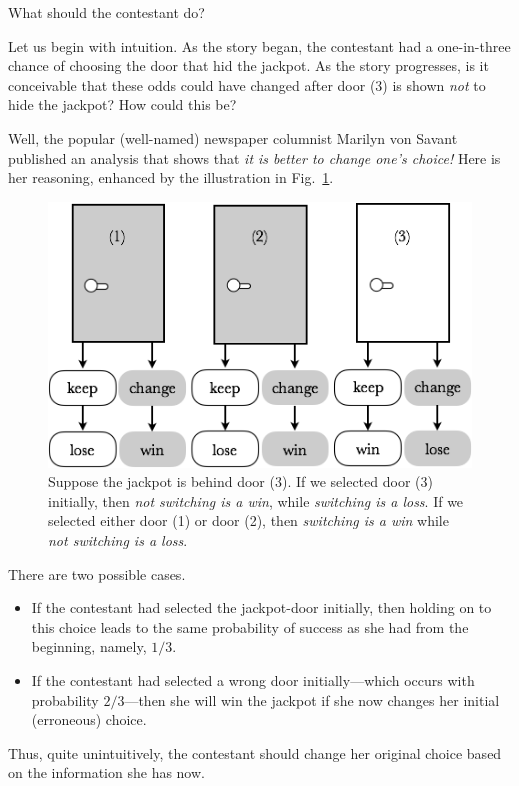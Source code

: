 \medskip

What should the contestant do?  

\medskip

Let us begin with intuition.  As the story began, the contestant had a one-in-three chance of choosing the door that hid the jackpot.  As the story progresses, is it conceivable that these odds could have changed after door (3) is shown {\em not} to hide the jackpot?  How could this be?

\smallskip

Well, the popular (well-named) newspaper columnist Marilyn von Savant published an analysis that shows that {\em it is better to change one's choice!}  Here is her reasoning, enhanced by the illustration in Fig.~\ref{fig:MonthyHall-2}.
\begin{figure}[htb]
\begin{center}
        \includegraphics[scale=0.4]{FiguresMaths/MonthyHall}
        \caption{Suppose the jackpot is behind door (3).  If we selected door (3) initially, then {\em not switching is a win}, while {\em switching is a loss}.  If we selected either door (1) or door (2), then {\em switching is a win}  while {\em not switching is a loss}.}
        \label{fig:MonthyHall-2}
\end{center}
\end{figure}
There are two possible cases.
\begin{itemize}
\item
If the contestant had selected the jackpot-door initially, then holding on to this choice leads to the same probability of success as she had from the beginning, namely, $1/3$.
\item
If the contestant had selected a wrong door initially---which occurs with probability $2/3$---then she will win the jackpot if she now changes her initial (erroneous) choice.
\end{itemize}
Thus, quite unintuitively, the contestant should change her original choice based on the information she has now.

